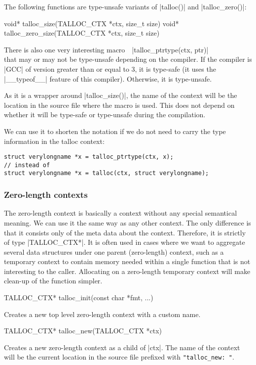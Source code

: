 The following functions are type-unsafe variants of |talloc()| and
|talloc_zero()|:

\begin{funcproto}
void* talloc_size(TALLOC_CTX *ctx, size_t size)
void* talloc_zero_size(TALLOC_CTX *ctx, size_t size)
\end{funcproto}
\funclistend
There is also one very interesting macro~~|talloc_ptrtype(ctx, ptr)| \\ that
may or may not be type-unsafe depending on the compiler. If the compiler is |GCC| of
version greater than or equal to 3, it is type-safe (it uses the |__typeof__|
feature of this compiler). Otherwise, it is type-unsafe.

As it is a wrapper around |talloc_size()|, the name of the context will be the
location in the source file where the macro is used. This does not depend on
whether it will be type-safe or type-unsafe during the compilation.

We can use it to shorten the notation if we do not need to carry the type
information in the talloc context:

\begin{lstlisting}[caption={talloc_ptrtype(ctx, ptr)},label=lst:talloc_ptrtype]
struct verylongname *x = talloc_ptrtype(ctx, x);
// instead of
struct verylongname *x = talloc(ctx, struct verylongname);
\end{lstlisting}

\subsubsection{Zero-length contexts}

The zero-length context is basically a context without any special semantical
meaning. We can use it the same way as any other context. The only difference
is that it consists only of the meta data about the context. Therefore, it is
strictly of type |TALLOC_CTX*|. It is often used in cases where we want to
aggregate several data structures under one parent (zero-length) context, such
as a temporary context to contain memory needed within a single function that
is not interesting to the caller. Allocating on a zero-length temporary context
will make clean-up of the function simpler.

\begin{funcproto}
TALLOC_CTX* talloc_init(const char *fmt, ...)
\end{funcproto}
\begin{funcdesc}
Creates a new top level zero-length context with a custom name.
\end{funcdesc}
\begin{funcproto}
TALLOC_CTX* talloc_new(TALLOC_CTX *ctx)
\end{funcproto}
\begin{funcdesc}
Creates a new zero-length context as a child of |ctx|. The name of the context
will be the current location in the source file prefixed with
\lstinline[showspaces=true]{"talloc_new: "}.
\end{funcdesc}

